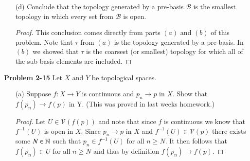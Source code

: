 \documentclass[minion]{homework651}
\def\calB{\mathcal{B}}
\begin{document}
\begin{problems}
\begin{enumerate}
    \begin{proof} ($\Leftarrow$) Let $Y$ be any topological space, consider the map 
        $f: Y \to X$ and suppose that for every $A \in \mathcal{A}$, $f^{-1}(A)$ is open in $Y$. Let $U \subseteq X$, and recall that by definition there exists a collection $\{\hat{A}_{j}\}_{J}$ where each $A_{j}$ is some finite intersection of the elements of $\mathcal{A}$ such that, 
        \begin{equation*}
        U = \bigcup_{j \in J}\hat{A}_{j} = \bigcup_{j \in J}\bigcap^n_{i \in I}A_{j,i}.
        \end{equation*}
        Considering the pre-image we find that, 
        \begin{equation*}
            f^{-1}(U) = f^{-1}\left(\bigcup_{j \in J}\bigcap^n_{i \in I}A_{j,i}\right) =\bigcup_{j \in J}\bigcap^n_{i \in I} f^{-1}\left(A_{j,i}\right)
        \end{equation*}
        Since $Y$ is a topological space and $f^{-1}(A)$ is open for every $A \in \mathcal{A}$ we can conclude that  $f^{-1}(U)$ is open in $Y$ and thus $f$ is continuous. 
    \end{proof}





    \item[(d)] Conclude that the topology generated by a pre-basis $\calB$ is the smallest topology in which every set from 
    $\calB$ is open.   
    \begin{proof} This conclusion comes directly from parts $(a)$ and $(b)$ of this problem. Note that $\tau$ from $(a)$ is the topology generated by a pre-basis. In $(b)$ we showed that $\tau$ is the coarsest (or smallest) topology for which all of the sub-basis elements are included.         
    \end{proof}
\end{enumerate} 


\problem \textbf{Problem 2-15} Let $X$ and $Y$ be topological spaces. 
\begin{enumerate}
    \item[(a)] Suppose $f:X \to Y$ is continuous and $p_n \to p$ in $X$. Show that $f(p_n) \to f(p)$ in Y.  (This was proved in last weeks homework.) 
    \begin{proof}
        Let $U \in \mathcal{V}(f(p))$ and note that since $f$ is continuous we know that 
        $f^{-1}(U)$ is open in $X$. Since $p_n \to p$ in $X$ and $f^{-1}(U) \in \mathcal{V}(p)$ there exists some $N \in \mathbb N$ such that $p_n \in f^{-1}(U)$ for all 
        $n \geq N$. It then follows that $f(p_n) \in U$ for all $n \geq N$ and thus by definition $f(p_n) \to f(p)$.
    \end{proof}


\end{enumerate}
\end{problems}
\end{document}
